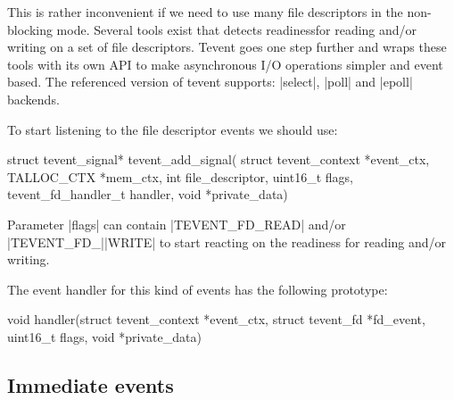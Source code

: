 This is rather inconvenient if we need to use many file descriptors in the
non-blocking mode. Several tools exist that detects readiness\footnotemark for
reading and/or writing on a set of file descriptors. Tevent goes one step
further and wraps these tools with its own API to make asynchronous I/O
operations simpler and event based. The referenced version of tevent supports:
|select|, |poll| and |epoll| backends.


To start listening to the file descriptor events we should use:
\begin{funcproto}
struct tevent_signal* tevent_add_signal(
             struct tevent_context *event_ctx,
             TALLOC_CTX *mem_ctx,
             int file_descriptor, uint16_t flags,
             tevent_fd_handler_t handler,
             void *private_data)   
\end{funcproto}
\begin{funcdesc}
Parameter |flags| can contain |TEVENT_FD_READ| and/or |TEVENT_FD_||WRITE| to
start reacting on the readiness for reading and/or writing.
\end{funcdesc}
\funclistend
The event handler for this kind of events has the following prototype:

\begin{funcproto}
void handler(struct tevent_context *event_ctx,
             struct tevent_fd *fd_event,
             uint16_t flags, void *private_data)
\end{funcproto}

\subsection{Immediate events}